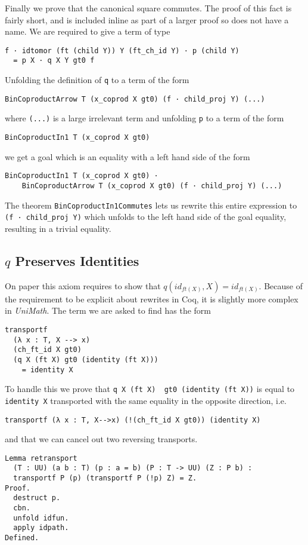 Finally we prove that the canonical square commutes. The proof of this fact is
fairly short, and is included inline as part of a larger proof so does not have
a name. We are required to give a term of type
\begin{lstlisting}
f · idtomor (ft (child Y)) Y (ft_ch_id Y) · p (child Y) 
  = p X · q X Y gt0 f
\end{lstlisting}
Unfolding the definition of \lstinline|q| to a term of the form
\begin{lstlisting}
BinCoproductArrow T (x_coprod X gt0) (f · child_proj Y) (...)
\end{lstlisting}
where \lstinline|(...)| is a large irrelevant term and unfolding \lstinline|p|
to a term of the form
\begin{lstlisting}
BinCoproductIn1 T (x_coprod X gt0)
\end{lstlisting}
we get a goal which is an equality with a left hand side of the form
\begin{lstlisting}
BinCoproductIn1 T (x_coprod X gt0) · 
    BinCoproductArrow T (x_coprod X gt0) (f · child_proj Y) (...)
\end{lstlisting}
The theorem \lstinline|BinCoproductIn1Commutes| lets us rewrite this entire
expression to \lstinline|(f · child_proj Y)| which unfolds to the left hand side
of the goal equality, resulting in a trivial equality.

\subsection{$q$ Preserves Identities}
On paper this axiom requires to show that $q(id_{ft(X)}, X) = id_{ft(X)}$.
Because of the requirement to be explicit about rewrites in Coq, it is slightly
more complex in \textit{UniMath}. The term we are asked to find has the form
\begin{lstlisting}
transportf 
  (λ x : T, X --> x) 
  (ch_ft_id X gt0) 
  (q X (ft X) gt0 (identity (ft X))) 
    = identity X
\end{lstlisting}

To handle this we prove that \lstinline|q X (ft X)  gt0 (identity (ft X))| is
equal to \lstinline|identity X| transported with the same equality in the
opposite direction, i.e.
\begin{lstlisting}
transportf (λ x : T, X-->x) (!(ch_ft_id X gt0)) (identity X)
\end{lstlisting}
and that we can cancel out two reversing transports.
\begin{lstlisting}
Lemma retransport 
  (T : UU) (a b : T) (p : a = b) (P : T -> UU) (Z : P b) :
  transportf P (p) (transportf P (!p) Z) = Z.
Proof.
  destruct p.
  cbn.
  unfold idfun.
  apply idpath.
Defined.
\end{lstlisting}

